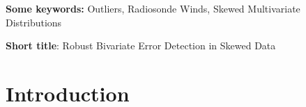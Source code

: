 \documentclass[12pt]{article}
\begin{document}


\par\vfill\noindent
{\bf Some keywords:}  Outliers, Radiosonde Winds, Skewed Multivariate Distributions

\par\medskip\noindent
{\bf Short title}:    Robust Bivariate Error Detection in Skewed  Data



\clearpage

\section{Introduction}\label{sec:intro}
\end{document}
